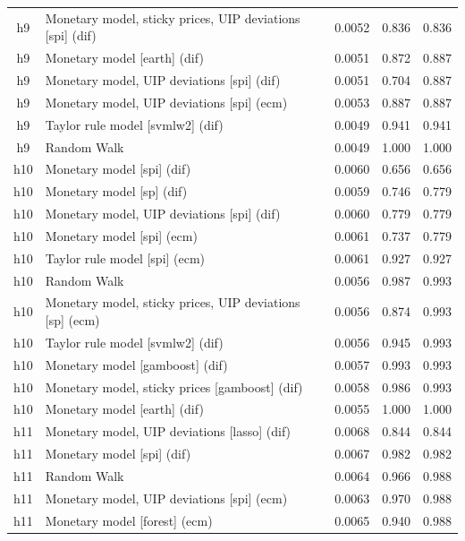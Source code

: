 \begin{ThreePartTable}
\begin{longtable}[t]{cp{5.5cm}ccc}
h9 & \raggedright Monetary model, sticky prices, UIP deviations [spi] (dif) & 0.0052 & 0.836 & 0.836\\
h9 & \raggedright Monetary model [earth] (dif) & 0.0051 & 0.872 & 0.887\\
h9 & \raggedright Monetary model, UIP deviations [spi] (dif) & 0.0051 & 0.704 & 0.887\\
h9 & \raggedright Monetary model, UIP deviations [spi] (ecm) & 0.0053 & 0.887 & 0.887\\
h9 & \raggedright Taylor rule model [svmlw2] (dif) & 0.0049 & 0.941 & 0.941\\
h9 & \raggedright Random Walk & 0.0049 & 1.000 & 1.000\\
\addlinespace
h10 & \raggedright Monetary model [spi] (dif) & 0.0060 & 0.656 & 0.656\\
h10 & \raggedright Monetary model [sp] (dif) & 0.0059 & 0.746 & 0.779\\
h10 & \raggedright Monetary model, UIP deviations [spi] (dif) & 0.0060 & 0.779 & 0.779\\
h10 & \raggedright Monetary model [spi] (ecm) & 0.0061 & 0.737 & 0.779\\
h10 & \raggedright Taylor rule model [spi] (ecm) & 0.0061 & 0.927 & 0.927\\
h10 & \raggedright Random Walk & 0.0056 & 0.987 & 0.993\\
h10 & \raggedright Monetary model, sticky prices, UIP deviations [sp] (ecm) & 0.0056 & 0.874 & 0.993\\
h10 & \raggedright Taylor rule model [svmlw2] (dif) & 0.0056 & 0.945 & 0.993\\
h10 & \raggedright Monetary model [gamboost] (dif) & 0.0057 & 0.993 & 0.993\\
h10 & \raggedright Monetary model, sticky prices [gamboost] (dif) & 0.0058 & 0.986 & 0.993\\
h10 & \raggedright Monetary model [earth] (dif) & 0.0055 & 1.000 & 1.000\\
\addlinespace
h11 & \raggedright Monetary model, UIP deviations [lasso] (dif) & 0.0068 & 0.844 & 0.844\\
h11 & \raggedright Monetary model [spi] (dif) & 0.0067 & 0.982 & 0.982\\
h11 & \raggedright Random Walk & 0.0064 & 0.966 & 0.988\\
h11 & \raggedright Monetary model, UIP deviations [spi] (ecm) & 0.0063 & 0.970 & 0.988\\
h11 & \raggedright Monetary model [forest] (ecm) & 0.0065 & 0.940 & 0.988\\

\end{longtable}
\end{ThreePartTable}
